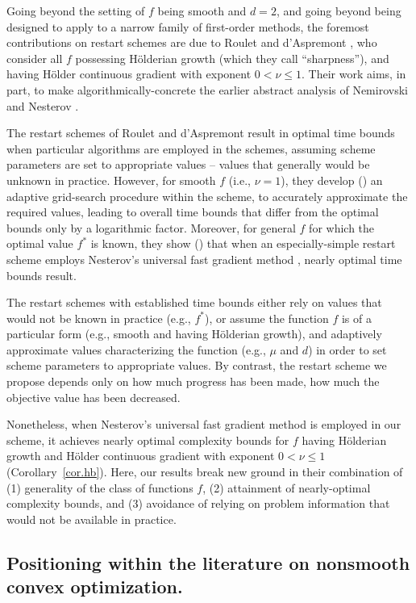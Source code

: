 \documentclass[reqno, 11pt]{amsart}
\numberwithin{equation}{section}
\begin{document}
Going beyond the setting of $ f $ being smooth and $ d = 2 $, and going beyond being designed to apply to a narrow family of first-order methods, the foremost contributions on restart schemes are due to Roulet and d'Aspremont \cite{roulet2017sharpness}, who consider all $ f $ possessing H\"{o}lderian growth (which they call ``sharpness''), and having H\"{o}lder continuous gradient with exponent $ 0 < \nu \leq 1 $. Their work aims, in part, to make algorithmically-concrete the earlier abstract analysis of Nemirovski and Nesterov \cite{NemNes85}. 

The restart schemes of Roulet and d'Aspremont result in optimal time bounds when particular algorithms are employed in the schemes, assuming scheme  parameters are set to appropriate values -- values that generally would be unknown in practice.  However, for smooth $ f $ (i.e., $ \nu = 1 $), they develop (\cite[\S3.2]{roulet2017sharpness}) an adaptive grid-search procedure within the scheme, to accurately approximate the required values, leading to overall time bounds that differ from the optimal bounds only by a logarithmic factor. Moreover, for general $ f $ for which the optimal value $ f^* $ is known, they show (\cite[\S4]{roulet2017sharpness}) that when an especially-simple restart scheme employs Nesterov's universal fast gradient method \cite{nesterov2015universal}, nearly optimal time bounds result.

The restart schemes with established time bounds either rely on values that would not be known in practice (e.g., $ f^* $), or assume the function $ f $ is of a particular form (e.g., smooth and having H\"{o}lderian growth), and adaptively approximate values characterizing the function (e.g., $ \mu $ and $ d $) in order to set scheme parameters to appropriate values.  By contrast, the restart scheme we propose depends only on how much progress has been made, how much the objective value has been decreased. 

Nonetheless, when Nesterov's universal fast gradient method \cite{nesterov2015universal} is employed in our scheme, it achieves nearly optimal complexity bounds for $ f $ having H\"{o}lderian growth and  H\"{o}lder continuous gradient with exponent $ 0 <   \nu \leq  1 $ (Corollary~\ref{cor.hb}).  Here, our results break new ground in their combination of (1) generality of the class of functions $ f $, (2) attainment of nearly-optimal complexity bounds, and (3) avoidance of relying on problem information that would not be available in practice.

\subsection{Positioning within the literature on nonsmooth convex optimization.} \label{sect.af}
\end{document}
